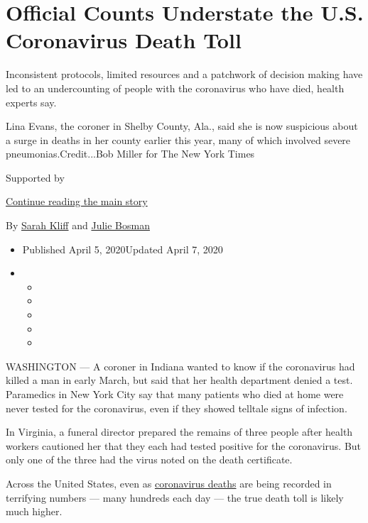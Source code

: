 \hypertarget{official-counts-understate-the-us-coronavirus-death-toll}{%
\section{Official Counts Understate the U.S. Coronavirus Death
Toll}\label{official-counts-understate-the-us-coronavirus-death-toll}}

Inconsistent protocols, limited resources and a patchwork of decision
making have led to an undercounting of people with the coronavirus who
have died, health experts say.

Lina Evans, the coroner in Shelby County, Ala., said she is now
suspicious about a surge in deaths in her county earlier this year, many
of which involved severe pneumonias.Credit...Bob Miller for The New York
Times

Supported by

\protect\hyperlink{after-sponsor}{Continue reading the main story}

By \href{https://www.nytimes3xbfgragh.onion/by/sarah-kliff}{Sarah Kliff}
and \href{https://www.nytimes3xbfgragh.onion/by/julie-bosman}{Julie
Bosman}

\begin{itemize}
\item
  Published April 5, 2020Updated April 7, 2020
\item
  \begin{itemize}
  \item
  \item
  \item
  \item
  \item
  \end{itemize}
\end{itemize}

WASHINGTON --- A coroner in Indiana wanted to know if the coronavirus
had killed a man in early March, but said that her health department
denied a test. Paramedics in New York City say that many patients who
died at home were never tested for the coronavirus, even if they showed
telltale signs of infection.

In Virginia, a funeral director prepared the remains of three people
after health workers cautioned her that they each had tested positive
for the coronavirus. But only one of the three had the virus noted on
the death certificate.

Across the United States, even as
\href{https://www.nytimes3xbfgragh.onion/interactive/2020/04/21/world/coronavirus-missing-deaths.html}{coronavirus
deaths} are being recorded in terrifying numbers --- many hundreds each
day --- the true death toll is likely much higher.

